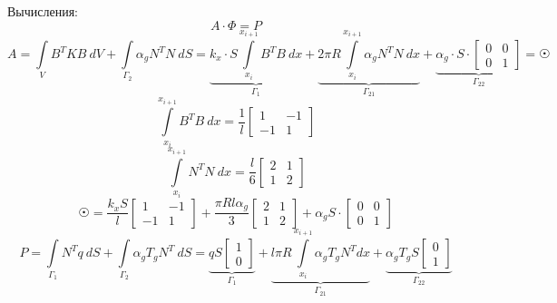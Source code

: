 \documentclass[a4paper, 12pt]{article}
\begin{document}
	Вычисления:
	\[
	A\cdot \Phi = P
	\]
	\[
	A=\int\limits_VB^TKB\ dV + \int\limits_{\Gamma_2} \alpha_g N^TN\ dS = \underbrace{k_x\cdot S \int\limits_{x_i}^{x_{i+1}} B^TB\ dx}_{\Gamma_1} + \underbrace{2\pi R \int\limits_{x_i}^{x_{i+1}} \alpha_g N^TN\ dx}_{\Gamma_{21}} +\underbrace{\alpha_g\cdot S \cdot \begin{bmatrix}
			0&0\\0&1
	\end{bmatrix}}_{\Gamma_{22}}=\astrosun
	\]
	\[
	\int\limits_{x_i}^{x_{i+1}} B^TB\ dx = \frac{1}{l}\begin{bmatrix}
		1&-1\\-1&1
	\end{bmatrix}
	\]
	\[
	\int\limits_{x_i}^{x_{i+1}} N^TN\ dx = \frac{l}{6}\begin{bmatrix}
		2&1\\1&2
	\end{bmatrix}
	\]
	\[
	\astrosun = \frac{k_x S}{l}\begin{bmatrix}
		1&-1\\-1&1
	\end{bmatrix}+\frac{\pi R l \alpha_g}{3}\begin{bmatrix}
	2&1\\1&2
	\end{bmatrix}+\alpha_gS \cdot \begin{bmatrix}
	0&0\\0&1
	\end{bmatrix}
	\]
	\[
	P=\int\limits_{\Gamma_1}N^T q\ dS +\int\limits_{\Gamma_2} \alpha_g T_g N^T \ dS = \underbrace{qS\begin{bmatrix}
			1\\0
	\end{bmatrix}}_{\Gamma_1}+\underbrace{l\pi R	\int\limits_{x_i}^{x_{i+1}} \alpha_g T_g N^T dx}_{\Gamma_{21}}+\underbrace{\alpha_g T_g S\begin{bmatrix}
	0\\1
\end{bmatrix}}_{\Gamma_{22}}
	\]
	
\end{document}
